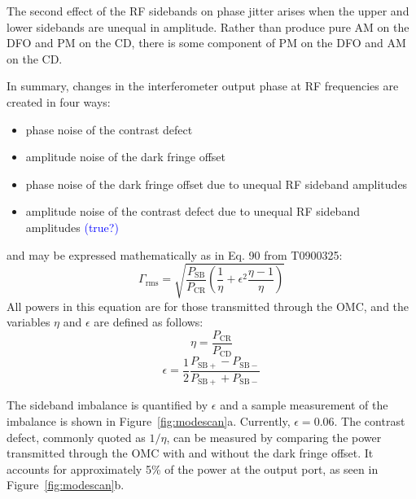 \documentclass{ligodoc}
\begin{document}
The second effect of the RF sidebands on phase jitter arises when the
upper and lower sidebands are unequal in amplitude. Rather than
produce pure AM on the DFO and PM on the CD, there is some component
of PM on the DFO and AM on the CD.

In summary, changes in the interferometer output phase at RF
frequencies are created in four ways:
\begin{itemize}
\item phase noise of the contrast defect
\item amplitude noise of the dark fringe offset 
\item phase noise of the dark fringe offset due to unequal RF sideband amplitudes 
\item amplitude noise of the contrast defect due to unequal RF sideband amplitudes \textcolor{blue}{(true?)}
\end{itemize}
and may be expressed mathematically as in Eq. 90 from T0900325: 
\begin{equation}
\Gamma_{\mathrm{rms}} = \sqrt{\frac{P_{\mathrm{SB}}}{P_{\mathrm{CR}}} \left( \frac{1}{\eta} + \epsilon^2 \frac{\eta-1}{\eta} \right)}
\label{eq:Gammarms}
\end{equation}
All powers in this equation are for those transmitted through the OMC,
and the variables $\eta$ and $\epsilon$ are defined as follows:
\begin{equation}
\eta = \frac{P_{\mathrm{CR}}}{P_{\mathrm{CD}}}
\end{equation}
\begin{equation}
\epsilon = \frac{1}{2}\frac{P_{\mathrm{SB+}}-P_{\mathrm{SB-}}}{P_{\mathrm{SB+}}+P_{\mathrm{SB-}}}
\end{equation}


The sideband imbalance is quantified by $\epsilon$ and a sample
measurement of the imbalance is shown in
Figure~\ref{fig:modescan}a. Currently, $\epsilon=0.06$. The contrast
defect, commonly quoted as $1/\eta$, can be measured by comparing the
power transmitted through the OMC with and without the dark fringe
offset. It accounts for approximately 5\% of the power at the output
port, as seen in Figure~\ref{fig:modescan}b.
\end{document}
